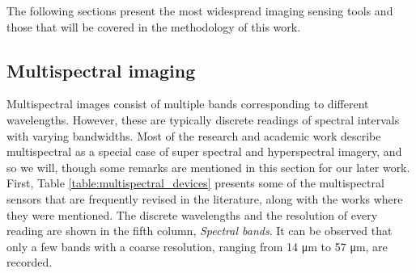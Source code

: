The following sections present the most widespread imaging sensing tools and those that will be covered in the methodology of this work.

\subsection{Multispectral imaging}
\label{sec:multispectral_imaging}

Multispectral images consist of multiple bands corresponding to different wavelengths. However, these are typically discrete readings of spectral intervals with varying bandwidths. Most of the research and academic work describe multispectral as a special case of super spectral and hyperspectral imagery, and so we will, though some remarks are mentioned in this section for our later work. First, Table \ref{table:multispectral_devices} presents some of the multispectral sensors that are frequently revised in the literature, along with the works where they were mentioned. The discrete wavelengths and the resolution of every reading are shown in the fifth column, \textit{Spectral bands}. It can be observed that only a few bands with a coarse resolution, ranging from 14 \si{\micro\meter} to 57 \si{\micro\meter}, are recorded.

